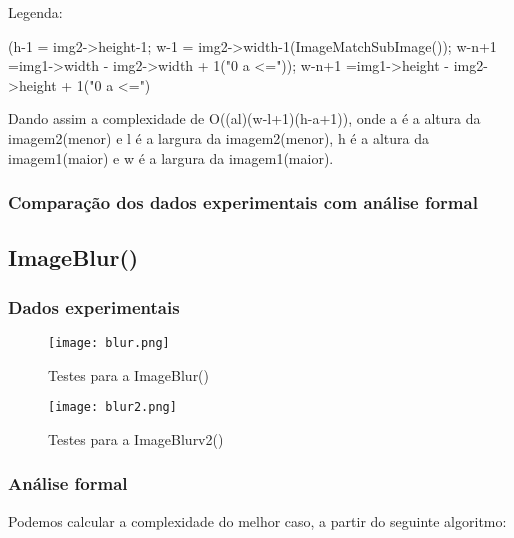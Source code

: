 \documentclass{article}
\begin{document}
    
    \begin{center}
    Legenda:
    
    (h-1 = img2->height-1; w-1 = img2->width-1(ImageMatchSubImage()); w-n+1 =img1->width - img2->width + 1("0 a <=")); w-n+1 =img1->height - img2->height + 1("0 a <=")
    \end{center}

Dando assim a complexidade de O((al)\times(w-l+1)\times(h-a+1)), onde a é a altura da imagem2(menor)
e l é a largura da imagem2(menor), h é a altura da imagem1(maior) e w é a largura da imagem1(maior). 






\subsubsection{Comparação dos dados experimentais com análise formal}

\subsection{ImageBlur()}

\subsubsection{Dados experimentais}


\begin{figure}[h]
    \centering
    \texttt{[image: blur.png]}
    \caption{Testes para a ImageBlur()}
    \label{fig:Figura 2}
\end{figure}





\begin{figure}[h]
    \centering
    \texttt{[image: blur2.png]}
    \caption{Testes para a ImageBlurv2()}
    \label{fig:Figura 3}
\end{figure}
\subsubsection{Análise formal}

Podemos calcular a complexidade do melhor caso, a partir do seguinte algoritmo:
\end{document}

